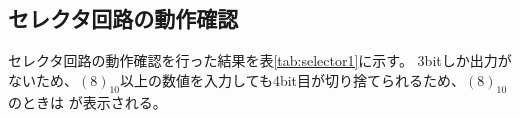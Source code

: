 \documentclass[a4paper,11pt,dvipdfmx]{jsarticle}
\begin{document}
\subsection{セレクタ回路の動作確認}
セレクタ回路の動作確認を行った結果を表\ref{tab:selector1}に示す。
3bitしか出力がないため、$(8)_10$以上の数値を入力しても4bit目が切り捨てられるため、$(8)_10$のときは 
 が表示される。
\end{document}
